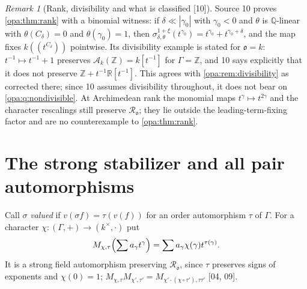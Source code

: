 \documentclass[11pt,oneside]{article}
\numberwithin{equation}{section}
\theoremstyle{definition}
\theoremstyle{remark}
\newtheorem{remark}[remark]{Remark}
\newcommand{\R}{\mathbb R}
\newcommand{\Q}{\mathbb Q}
\newcommand{\Z}{\mathbb Z}
\newcommand{\oo}{\mathfrak o}
\newcommand{\Ak}{\mathcal A_k}
\newcommand{\Ro}{\mathcal R_{\oo}}
\newcommand{\bb}{\mathbin{\ll}}
\newcommand{\Hahn}[2]{#1((t^{#2}))}
\newcommand{\src}[1]{\textup{\textsf{\small[#1]}}}
\begin{document}
\begin{remark}[Rank, divisibility and what is classified \src{10}]\label{opa:sc:rem:rankdiv}
Source 10 proves \cref{opa:thm:rank} with a binomial witness: if $\delta\bb|\gamma_0|$
with $\gamma_0<0$ and $\theta$ is $\Q$-linear with $\theta(C_\delta)=0$ and $\theta(\gamma_0)=1$,
then $\sigma^{1+\xi}_{\delta,\theta}(t^{\gamma_0})=t^{\gamma_0}+t^{\gamma_0+\delta}$, and the map fixes
$\Hahn k{C_\delta}$ pointwise. Its divisibility example is stated for $\oo=k$:
$t^{-1}\mapsto t^{-1}+1$ preserves $\Ak(\Z)=k[t^{-1}]$ for $\Gamma=\Z$, and
10 says explicitly that it does not preserve $\Z+t^{-1}\R[t^{-1}]$. This agrees
with \cref{opa:rem:divisibility} as corrected there; since 10 assumes
divisibility throughout, it does not bear on \cref{opa:q:nondivisible}. At
Archimedean rank the monomial maps $t^\gamma\mapsto t^{2\gamma}$ and the character
rescalings still preserve $\Ro$; they lie outside the leading-term-fixing factor
and are no counterexample to \cref{opa:thm:rank}.
\end{remark}

\section{The strong stabilizer and all pair automorphisms}\label{opa:sec:factorization}

Call $\sigma$ \emph{valued} if $v(\sigma f)=\tau(v(f))$ for an order automorphism
$\tau$ of $\Gamma$. For a character $\chi:(\Gamma,+)\to(k^\times,\cdot)$ put
\begin{equation}\label{opa:eq:monomialmap}
 M_{\chi,\tau}\Bigl(\sum a_\gamma t^\gamma\Bigr)=\sum a_\gamma\chi(\gamma)t^{\tau(\gamma)}.
\end{equation}
It is a strong field automorphism preserving $\Ro$, since $\tau$ preserves signs
of exponents and $\chi(0)=1$; $M_{\chi,\tau}M_{\chi',\tau'}=
M_{\chi'\cdot(\chi\circ\tau'),\tau\tau'}$ \src{04, 09}.
\end{document}

